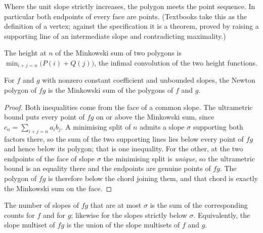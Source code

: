 \begin{proposition}
  \label{prop:vertex-is-point}
  \leanok
  Where the unit slope strictly increases, the polygon meets the point sequence.  In particular
  both endpoints of every face are points.  (Textbooks take this as the definition of a vertex;
  against the specification it is a theorem, proved by raising a supporting line of an
  intermediate slope and contradicting maximality.)
\end{proposition}

\begin{definition}
  \label{def:minkowskiheight}
  \leanok
  The height at $n$ of the Minkowski sum of two polygons is
  $\min_{i + j = n}\bigl(P(i) + Q(j)\bigr)$, the infimal convolution of the two height functions.
\end{definition}

\begin{theorem}
  \label{thm:np-product}
  \leanok
  For $f$ and $g$ with nonzero constant coefficient and unbounded slopes, the Newton polygon of
  $fg$ is the Minkowski sum of the polygons of $f$ and $g$.
\end{theorem}

\begin{proof}
  \leanok
  Both inequalities come from the face of a common slope.  The ultrametric bound puts every point
  of $fg$ on or above the Minkowski sum, since $c_n = \sum_{i+j=n} a_i b_j$.  A minimising split
  of $n$ admits a slope $\sigma$ supporting both factors there, so the sum of the two supporting
  lines lies below every point of $fg$ and hence below its polygon; that is one inequality.  For
  the other, at the two endpoints of the face of slope $\sigma$ the minimising split is
  \emph{unique}, so the ultrametric bound is an equality there and the endpoints are genuine
  points of $fg$.  The polygon of $fg$ is therefore below the chord joining them, and that chord
  is exactly the Minkowski sum on the face.
\end{proof}

\begin{corollary}
  \label{cor:np-product-multiplicity}
  \leanok
  The number of slopes of $fg$ that are at most $\sigma$ is the sum of the corresponding counts
  for $f$ and for $g$; likewise for the slopes strictly below $\sigma$.  Equivalently, the slope
  multiset of $fg$ is the union of the slope multisets of $f$ and $g$.
\end{corollary}

